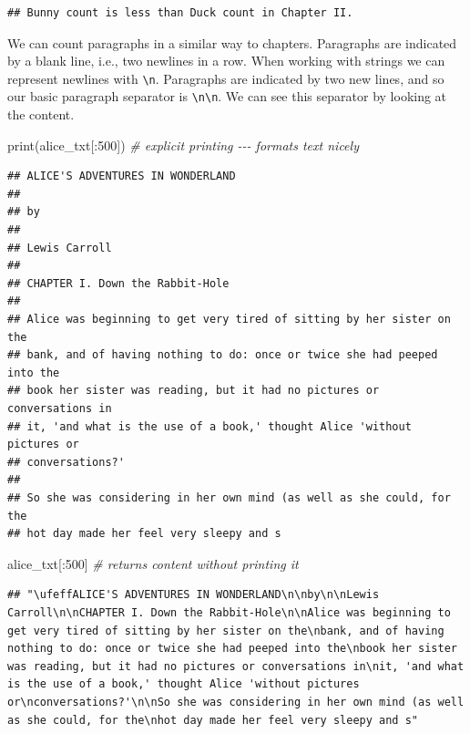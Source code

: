 \documentclass[
]{book}
\newenvironment{Shaded}{\begin{snugshade}}{\end{snugshade}}
\newcommand{\BuiltInTok}[1]{#1}
\newcommand{\CommentTok}[1]{\textcolor[rgb]{0.56,0.35,0.01}{\textit{#1}}}
\newcommand{\DecValTok}[1]{\textcolor[rgb]{0.00,0.00,0.81}{#1}}
\newcommand{\NormalTok}[1]{#1}
\begin{document}
\begin{verbatim}
## Bunny count is less than Duck count in Chapter II.
\end{verbatim}

We can count paragraphs in a similar way to chapters. Paragraphs are indicated by a blank line, i.e., two newlines in a row. When working with strings we can represent newlines with \texttt{\textbackslash{}n}. Paragraphs are indicated by two new lines, and so our basic paragraph separator is \texttt{\textbackslash{}n\textbackslash{}n}. We can see this separator by looking at the content.

\begin{Shaded}
\begin{Highlighting}[]
\BuiltInTok{print}\NormalTok{(alice\_txt[:}\DecValTok{500}\NormalTok{]) }\CommentTok{\# explicit printing {-}{-}{-} formats text nicely}
\end{Highlighting}
\end{Shaded}

\begin{verbatim}
## ﻿ALICE'S ADVENTURES IN WONDERLAND
## 
## by
## 
## Lewis Carroll
## 
## CHAPTER I. Down the Rabbit-Hole
## 
## Alice was beginning to get very tired of sitting by her sister on the
## bank, and of having nothing to do: once or twice she had peeped into the
## book her sister was reading, but it had no pictures or conversations in
## it, 'and what is the use of a book,' thought Alice 'without pictures or
## conversations?'
## 
## So she was considering in her own mind (as well as she could, for the
## hot day made her feel very sleepy and s
\end{verbatim}

\begin{Shaded}
\begin{Highlighting}[]
\NormalTok{alice\_txt[:}\DecValTok{500}\NormalTok{] }\CommentTok{\# returns content without printing it}
\end{Highlighting}
\end{Shaded}

\begin{verbatim}
## "\ufeffALICE'S ADVENTURES IN WONDERLAND\n\nby\n\nLewis Carroll\n\nCHAPTER I. Down the Rabbit-Hole\n\nAlice was beginning to get very tired of sitting by her sister on the\nbank, and of having nothing to do: once or twice she had peeped into the\nbook her sister was reading, but it had no pictures or conversations in\nit, 'and what is the use of a book,' thought Alice 'without pictures or\nconversations?'\n\nSo she was considering in her own mind (as well as she could, for the\nhot day made her feel very sleepy and s"
\end{verbatim}
\end{document}
